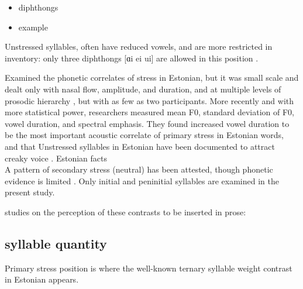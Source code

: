 \begin{itemize}
\item diphthongs 
\item example
\end{itemize}


Unstressed syllables, often have reduced vowels, and are more restricted in inventory: only three diphthongs [ɑi ei ui] are allowed in this position \citep{lippusAcousticStudyEstonian2014a}. 

Examined the phonetic correlates of stress in Estonian, but it was small scale and dealt only with nasal flow, amplitude, and duration, and at multiple levels of prosodic hierarchy \citep{gordonPhoneticCorrelatesStress1997}, but with as few as two participants. 
More recently and with more statistical power, researchers measured mean F0, standard deviation of F0, vowel duration, and spectral emphasis. They found increased vowel duration to be the most important acoustic correlate of primary stress in Estonian words, and that Unstressed syllables in Estonian have been documented to attract creaky voice \citep{lippusAcousticStudyEstonian2014a}. 
Estonian facts \citep{alma991001659729706011} \\
A pattern of secondary stress (neutral) has been attested, though phonetic evidence is limited \citep{asuAcousticCorrelatesSecondary2018}. Only initial and peninitial syllables are examined in the present study.

studies on the perception of these contrasts to be inserted in prose: 

\citep{meisterPerceptionShortVs2011a, kaskPerceptualAsymmetriesAuditory2021, eekSimplePerceptionExperiments1997}


\subsection{syllable quantity}
Primary stress position is where the well-known ternary syllable weight contrast in Estonian appears.




